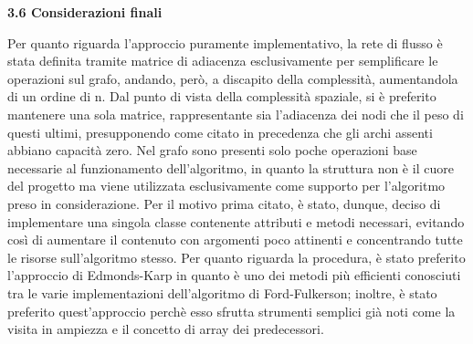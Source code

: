 \documentclass{article}
\begin{document}
\begin{flushleft}
\begin{Large}\textbf{3.6 Considerazioni finali}\end{Large}
\newline

Per quanto riguarda l'approccio puramente implementativo, la rete di flusso è stata definita tramite matrice di adiacenza esclusivamente per semplificare le operazioni sul grafo, andando, però, a discapito della complessità, aumentandola di un ordine di n. Dal punto di vista della complessità spaziale, si è preferito mantenere una sola matrice, rappresentante sia l'adiacenza dei nodi che il peso di questi ultimi, presupponendo come citato in precedenza che gli archi assenti abbiano capacità zero.
\newline
\newline
Nel grafo sono presenti solo poche operazioni base necessarie al funzionamento dell'algoritmo, in quanto la struttura non è il cuore del progetto ma viene utilizzata esclusivamente come supporto per l'algoritmo preso in considerazione.
Per il motivo prima citato, è stato, dunque, deciso di implementare una singola classe contenente attributi e metodi necessari, evitando così di aumentare il contenuto con argomenti poco attinenti e  concentrando tutte le risorse sull'algoritmo stesso.
\newline
Per quanto riguarda la procedura, è stato preferito l'approccio di Edmonds-Karp in quanto è uno dei metodi più efficienti conosciuti tra le varie implementazioni dell'algoritmo di Ford-Fulkerson; inoltre, è stato preferito quest'approccio perchè esso sfrutta strumenti semplici già noti come la visita in ampiezza e il concetto di array dei predecessori. 
\end{flushleft}
\newpage
\end{document}
